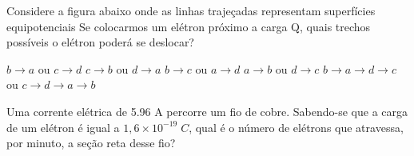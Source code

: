 \documentclass[12pt, addpoints]{exam}
\begin{document}
        \begin{questions}
\begin{multicols*}{2}
\question Considere a figura abaixo onde as linhas trajeçadas representam superfícies equipotenciais Se colocarmos um elétron próximo a carga Q, quais trechos possíveis o elétron poderá se deslocar?
        
        \begin{center}
            \begin{minipage}[c]{0.5\linewidth}
            \end{minipage}
        \end{center}
        
        

\begin{choices}
\choice $b\rightarrow a$ ou $c\rightarrow d$ 
\choice $c\rightarrow b$ ou $d\rightarrow a$ 
\choice $b\rightarrow c$ ou $a\rightarrow d$ 
\choice $a\rightarrow b$ ou $d\rightarrow c$ 
\choice $b\rightarrow a\rightarrow d\rightarrow c$ ou $c\rightarrow d\rightarrow a\rightarrow b$ 
\end{choices}
\question Uma corrente elétrica de    5.96 A percorre um ﬁo de cobre. Sabendo-se que a carga de um elétron é igual a $1,6\times 10^{-19}\;C$, qual é o número de elétrons que atravessa, por minuto, a seção reta desse ﬁo?


\end{multicols*}
\end{questions}
\end{document}

